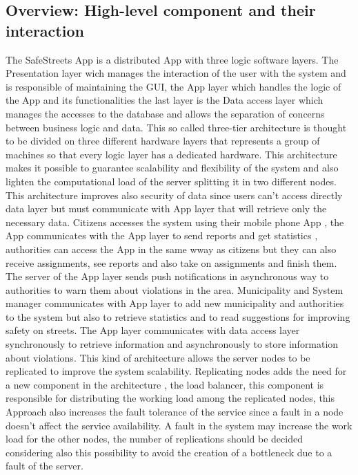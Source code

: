 \subsection{Overview: High-level component and their interaction}
The SafeStreets App is a distributed App with three logic software layers.
The Presentation layer wich manages the interaction of the user with the system and is responsible of maintaining the GUI, 
the App layer which handles the logic of the App and its functionalities the last layer is the Data access layer which manages the accesses to the database and allows the separation of concerns between business logic and data.
This so called three-tier architecture is thought to be divided on three different hardware layers that represents a group of machines so that every logic layer has a dedicated hardware. This architecture makes it possible to guarantee scalability and flexibility of the system and also lighten the computational load of the server splitting it in two different nodes.
This architecture improves also security of data since users can't access directly data layer but must communicate with App layer that will retrieve only the necessary data.
Citizens accesses the system using their mobile phone App , the App communicates with the App layer to send reports and get statistics , authorities can access the App in the same wway as citizens but they can also receive assignments, see reports and also take on assignments and finish them.
The server of the App layer sends push notifications in asynchronous way to authorities to warn them about violations in the area.
Municipality and System manager communicates with App layer to add new municipality and authorities to the system but also to retrieve statistics and to read suggestions for improving safety on streets.
The App layer communicates with data access layer synchronously to retrieve information and asynchronously to store information about violations.
This kind of architecture allows the server nodes to be replicated to improve the system scalability.
Replicating nodes adds the need for a new component in the architecture , the load balancer, this component is responsible for distributing the working load among the replicated nodes, this Approach also increases the fault tolerance of the service since a fault in a node doesn't affect the service availability. A fault in the system may increase the work load for the other nodes, the number of replications should be decided considering also this possibility to avoid the creation of a bottleneck due to a fault of the server.

